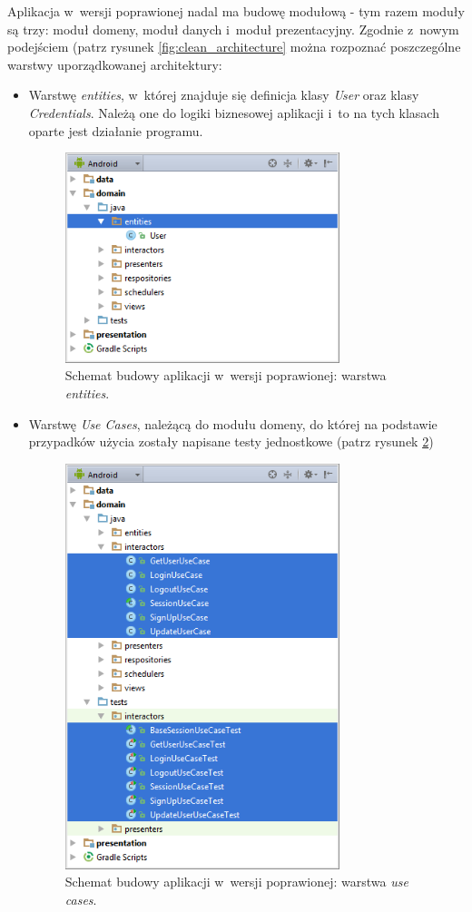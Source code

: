 Aplikacja w~wersji poprawionej nadal ma budowę modułową - tym razem moduły są trzy: moduł domeny, moduł danych i~moduł prezentacyjny. Zgodnie z~nowym podejściem (patrz rysunek \ref{fig:clean_architecture} można rozpoznać poszczególne warstwy uporządkowanej architektury:
\begin{itemize}
\item
Warstwę \textit{entities}, w~której znajduje się definicja klasy \textit{User} oraz klasy \textit{Credentials}. Należą one do logiki biznesowej aplikacji i~to na tych klasach oparte jest działanie programu. 
\begin{figure}[!htb]
    \centering
    \includegraphics[width=8cm]{imgs/ch6_app_cl_entities.png}
    \caption
{Schemat budowy aplikacji w~wersji poprawionej: warstwa \textit{entities}.}
    \label{fig:app_cl_entities}
\end{figure} 

\item
Warstwę \textit{Use Cases}, należącą do modułu domeny, do której na podstawie przypadków użycia zostały napisane testy jednostkowe (patrz rysunek \ref{fig:app_cl_usecases})
\begin{figure}[!htb]
    \centering
    \includegraphics[width=8cm]{imgs/ch6_app_cl_usecases.png}
    \caption
{Schemat budowy aplikacji w~wersji poprawionej: warstwa \textit{use cases}.}
    \label{fig:app_cl_usecases}
\end{figure} 


\end{itemize}
